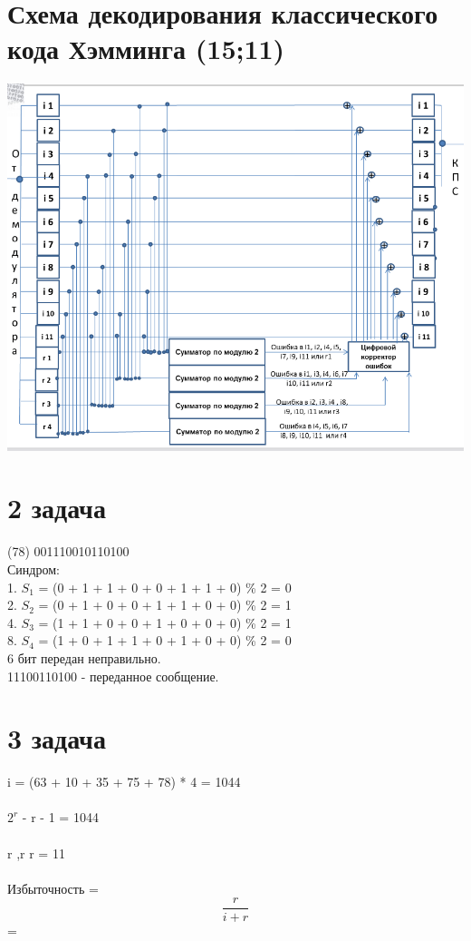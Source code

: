 \documentclass[12pt,onecolumn]{article}
\begin{document}
\section{Схема декодирования классического кода Хэмминга (15;11)}
\includegraphics[width=15cm]{img/img2.png}
\newpage
\section{2 задача}
(78) 001110010110100 \\
   Синдром:\\
   1. $S_1$ = (0 + 1 + 1 + 0 + 0 + 1 + 1 + 0) \% 2 = 0\\
   2. $S_2$ = (0 + 1 + 0 + 0 + 1 + 1 + 0 + 0) \% 2 = 1\\
   4. $S_3$ = (1 + 1 + 0 + 0 + 1 + 0 + 0 + 0) \% 2 = 1\\
   8. $S_4$ = (1 + 0 + 1 + 1 + 0 + 1 + 0 + 0) \% 2 = 0\\
   6 бит передан неправильно.\\
   11100110100 - переданное сообщение.
\newpage
\section{3 задача}
  i = (63 + 10 + 35 + 75 + 78) * 4 = 1044\\
  \\
  $2^r$ - r - 1 = 1044\\
  \\
  r  ,r \in {} \Rightarrow r  = 11\\
  \\
  Избыточность = $$\frac{r}{i + r}$$ =  \\
  \\
\newpage
\end{document}
